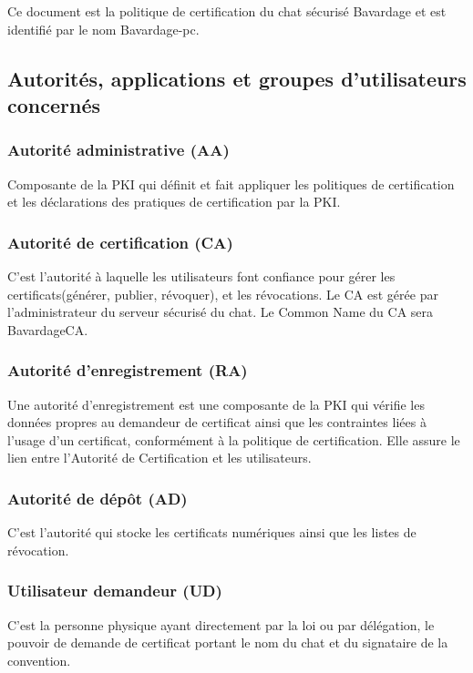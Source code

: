 \documentclass[a4paper,11pt,french]{book}
\begin{document}
Ce document est la politique de certification du chat sécurisé Bavardage et est identifié par le nom Bavardage-pc.


\subsection{ Autorités, applications et groupes d'utilisateurs concernés }
\subsubsection{Autorité administrative (AA)}

Composante de la PKI qui définit et fait appliquer les politiques de certification et les déclarations des pratiques de certification par la PKI.
	
\subsubsection{Autorité de certification (CA)}
C'est l'autorité à laquelle les utilisateurs font confiance pour gérer les certificats(générer, publier, révoquer), et les révocations. Le CA est gérée par l'administrateur du serveur sécurisé du chat. Le Common Name du CA sera BavardageCA.


\subsubsection{Autorité d'enregistrement (RA)}

Une autorité d’enregistrement est une composante de la PKI qui vérifie les données propres au demandeur de certificat ainsi que les contraintes liées à l’usage d’un certificat, conformément à la politique de certification. Elle assure le lien entre l'Autorité de Certification et les utilisateurs. 

\subsubsection{Autorité de dépôt (AD)}
C'est l'autorité qui stocke les certificats numériques ainsi que les listes de révocation.

\subsubsection{ Utilisateur demandeur (UD)}

C'est la personne physique ayant directement par la loi ou par délégation, le pouvoir de demande de certificat portant le nom du chat et du signataire de la convention.
\end{document}
